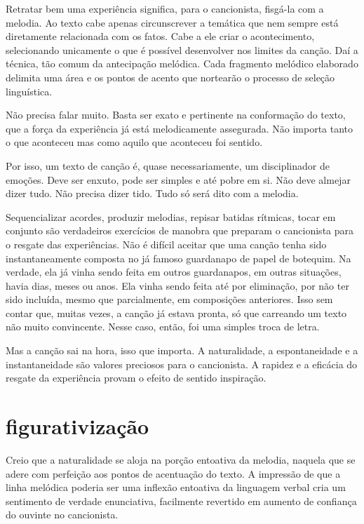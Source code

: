 Retratar bem uma experiência significa, para o cancionista, fisgá-la com
a melodia. Ao texto cabe apenas circunscrever a temática que nem sempre
está diretamente relacionada com os fatos. Cabe a ele criar o
acontecimento, selecionando unicamente o que é possível desenvolver nos
limites da canção. Daí a técnica, tão comum da antecipação melódica.
Cada fragmento melódico elaborado delimita uma área e os pontos de
acento que nortearão o processo de seleção linguística.

Não precisa falar muito. Basta ser exato e pertinente na conformação do
texto, que a força da experiência já está melodicamente assegurada. Não
importa tanto o que aconteceu mas como aquilo que aconteceu foi sentido.

Por isso, um texto de canção é, quase necessariamente, um disciplinador
de emoções. Deve ser enxuto, pode ser simples e até pobre em si. Não
deve almejar dizer tudo. Não precisa dizer tido. Tudo só será dito com a
melodia.

Sequencializar acordes, produzir melodias, repisar batidas rítmicas,
tocar em conjunto são verdadeiros exercícios de manobra que preparam o
cancionista para o resgate das experiências. Não é difícil aceitar que
uma canção tenha sido instantaneamente composta no já famoso guardanapo
de papel de botequim. Na verdade, ela já vinha sendo feita em outros
guardanapos, em outras situações, havia dias, meses ou anos. Ela vinha
sendo feita até por eliminação, por não ter sido incluída, mesmo que
parcialmente, em composições anteriores. Isso sem contar que, muitas
vezes, a canção já estava pronta, só que carreando um texto não muito
convincente. Nesse caso, então, foi uma simples troca de letra.

Mas a canção sai na hora, isso que importa. A naturalidade, a
espontaneidade e a instantaneidade são valores preciosos para o
cancionista. A rapidez e a eficácia do resgate da experiência provam o
efeito de sentido inspiração.

\section{figurativização}

Creio que a naturalidade se aloja na porção entoativa da melodia,
naquela que se adere com perfeição aos pontos de acentuação do texto. A
impressão de que a linha melódica poderia ser uma inflexão entoativa da
linguagem verbal cria um sentimento de verdade enunciativa, facilmente
revertido em aumento de confiança do ouvinte no cancionista.

